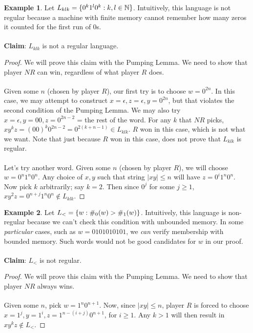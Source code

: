 \documentclass[]{article}
\DeclarePairedDelimiter{\set}{\lbrace}{\rbrace}
\theoremstyle{definition}
\newtheorem{ex}{Example}[section]
\newcommand{\lecture}[1]{\marginpar{{\footnotesize $\leftarrow$ \underline{#1}}}}
\begin{document}
        \begin{ex} \lecture{October 8, 2013}
          Let $L_{klk} = \set{ 0^k 1^l 0^k : k, l \in \mathbb{N}}$. Intuitively, this language is not regular because a machine with finite memory cannot remember how many zeros it counted for the first run of 0s.
          \\ \\
          \textbf{Claim}: $L_{klk}$ is not a regular language.

          \begin{proof}
            We will prove this claim with the Pumping Lemma. We need to show that player $NR$ can win, regardless of what player $R$ does.
            \\ \\
            Given some $n$ (chosen by player $R$), our first try is to choose $w = 0^{2n}$. In this case, we may attempt to construct $x = \epsilon, z = \epsilon, y = 0^{2n}$, but that violates the second condition of the Pumping Lemma. We may also try $x = \epsilon, y = 00, z = 0^{2n - 2}$ = the rest of the word. For any $k$ that $NR$ picks, $xy^kz = (00)^k 0^{2n - 2} = 0^{2(k + n - 1)} \in L_{klk}$. $R$ won in this case, which is not what we want. Note that just because $R$ won in this case, does not prove that $L_{klk}$ is regular.
            \\ \\
            Let's try another word. Given some $n$ (chosen by player $R$), we will choose $w = 0^n 1^n 0^n$. Any choice of $x, y$ such that string $|xy| \le n$ will have $z = 0^i 1^n 0^n$. Now pick $k$ arbitrarily; say $k = 2$. Then since $0^j$ for some $j \ge 1$, $xy^2z = 0^{n + j}1^n0^n \not \in L_{klk}$.
          \end{proof}
        \end{ex}

        \begin{ex}
          Let $L_< = \set{w : \#_0(w) > \#_1(w) }$. Intuitively, this language is non-regular because we can't check this condition with unbounded memory. In some \emph{particular} cases, such as $w = 0101010101$, we \emph{can} verify membership with bounded memory. Such words would not be good candidates for $w$ in our proof.
          \\ \\
          \textbf{Claim}: $L_<$ is not regular.

          \begin{proof}
            We will prove this claim with the Pumping Lemma. We need to show that player $NR$ always wins.
            \\ \\
            Given some $n$, pick $w = 1^n 0^{n + 1}$. Now, since $|xy| \le n$, player $R$ is forced to choose $x = 1^j, y = 1^i, z = 1^{n - (i + j)} 0^{n + 1}$, for $i \ge 1$. Any $k > 1$ will then result in $xy^kz \not \in L_<$.
          \end{proof}
        \end{ex}
\end{document}
